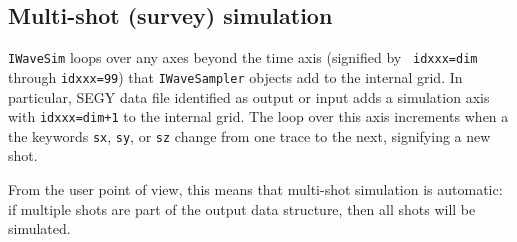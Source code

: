 \subsection{Multi-shot (survey) simulation}

{\tt IWaveSim} loops over any axes beyond the time axis (signified by {\tt
  idxxx=dim} through {\tt idxxx=99}) that {\tt IWaveSampler} objects 
add to the internal grid. In particular, SEGY data file identified as output or
input adds a simulation axis with {\tt idxxx=dim+1} to the internal
grid. The loop over this axis increments when a the keywords {\tt sx},
{\tt sy}, or {\tt sz} change from one trace to the next, signifying a
new shot.

From the user point of view, this means that multi-shot simulation is
automatic: if multiple shots are part of the output data structure,
then all shots will be simulated.

